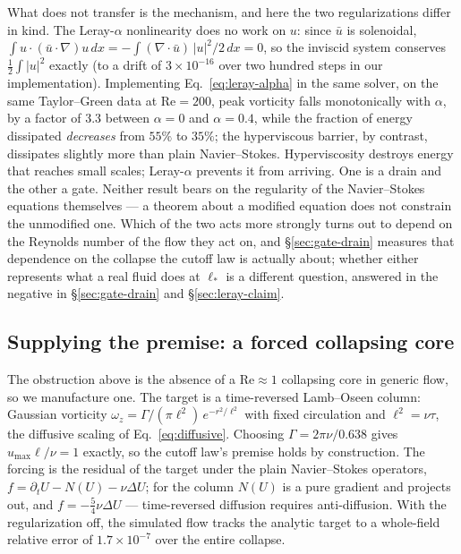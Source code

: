 \documentclass[11pt,a4paper]{article}
\begin{document}
What does not transfer is the mechanism, and here the two regularizations differ in kind. The Leray-$\alpha$
nonlinearity does no work on $u$: since $\bar u$ is solenoidal,
$\int u\cdot(\bar u\cdot\nabla)u\,dx=-\int(\nabla\cdot\bar u)\,|u|^2/2\,dx=0$, so the inviscid
system conserves $\tfrac12\int|u|^2$ exactly (to a drift of $3\times10^{-16}$ over two hundred steps
in our implementation). Implementing Eq.~\eqref{eq:leray-alpha} in the same solver, on the same
Taylor--Green data at $\mathrm{Re}=200$, peak vorticity falls monotonically with $\alpha$, by a
factor of $3.3$ between $\alpha=0$ and $\alpha=0.4$, while the fraction of energy dissipated
\emph{decreases} from $55\%$ to $35\%$; the hyperviscous barrier, by contrast, dissipates slightly
more than plain Navier--Stokes. Hyperviscosity destroys energy that reaches small scales;
Leray-$\alpha$ prevents it from arriving. One is a drain and the other a gate. Neither result bears
on the regularity of the Navier--Stokes equations themselves --- a theorem about a modified equation
does not constrain the unmodified one. Which of the two acts more strongly turns out to depend on
the Reynolds number of the flow they act on, and \S\ref{sec:gate-drain} measures that dependence on
the collapse the cutoff law is actually about; whether either represents what a real fluid does at
$\ell_*$ is a different question, answered in the negative in \S\ref{sec:gate-drain} and
\S\ref{sec:leray-claim}.

\subsection{Supplying the premise: a forced collapsing core}
\label{sec:forced-core}

The obstruction above is the absence of a $\mathrm{Re}\approx1$ collapsing core in generic flow, so
we manufacture one. The target is a time-reversed Lamb--Oseen column: Gaussian vorticity
$\omega_z=\Gamma/(\pi\ell^2)\,e^{-r^2/\ell^2}$ with fixed circulation and $\ell^2=\nu\tau$, the
diffusive scaling of Eq.~\eqref{eq:diffusive}. Choosing $\Gamma=2\pi\nu/0.638$ gives
$u_{\max}\ell/\nu=1$ exactly, so the cutoff law's premise holds by construction. The forcing is the
residual of the target under the plain Navier--Stokes operators, $f=\partial_tU-N(U)-\nu\Delta U$;
for the column $N(U)$ is a pure gradient and projects out, and $f=-\tfrac54\nu\Delta U$ ---
time-reversed diffusion requires anti-diffusion. With the regularization off, the simulated flow
tracks the analytic target to a whole-field relative error of $1.7\times10^{-7}$ over the entire
collapse.
\end{document}
